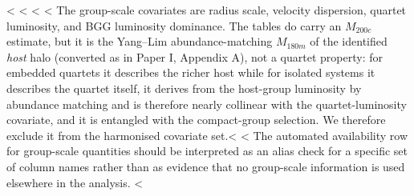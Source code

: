 \documentclass{aa}
\newcommand{\CB}{Control\textsubscript{4B}}
\newcommand{\CC}{Control\textsubscript{4C}}
\newcommand{\RG}{RG\textsubscript{4}}
\begin{document}
\begin{appendix}
<%
<%
<%
<%
The group-scale covariates are radius scale, velocity dispersion, quartet luminosity, and BGG luminosity dominance. The tables do carry an \(M_{200c}\) estimate, but it is the Yang--Lim abundance-matching \(M_{180m}\) of the identified \emph{host} halo (converted as in Paper I, Appendix A), not a quartet property: for embedded quartets it describes the richer host while for isolated systems it describes the quartet itself, it derives from the host-group luminosity by abundance matching and is therefore nearly collinear with the quartet-luminosity covariate, and it is entangled with the compact-group selection. We therefore exclude it from the harmonised covariate set.<%
<%
The automated availability row for group-scale quantities should be interpreted as an alias check for a specific set of column names rather than as evidence that no group-scale information is used elsewhere in the analysis.
<%


\end{appendix}
\end{document}
